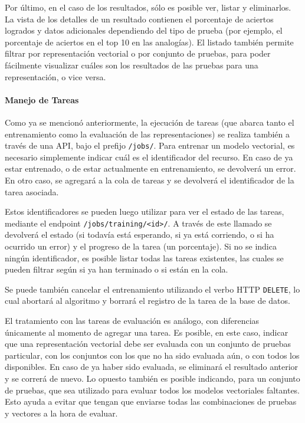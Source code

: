 Por último, en el caso de los resultados, sólo es posible ver, listar y eliminarlos. La vista de los
detalles de un resultado contienen el porcentaje de aciertos logrados y datos adicionales
dependiendo del tipo de prueba (por ejemplo, el porcentaje de aciertos en el top 10 en las
analogías). El listado también permite filtrar por representación vectorial o por conjunto de pruebas,
para poder fácilmente visualizar cuáles son los resultados de las pruebas para una representación, o
vice versa.


\paragraph{Manejo de Tareas}

Como ya se mencionó anteriormente, la ejecución de tareas (que abarca tanto el entrenamiento como la
evaluación de las representaciones) se realiza también a través de una API, bajo el prefijo
\texttt{/jobs/}. Para entrenar un modelo vectorial, es necesario simplemente indicar cuál es el
identificador del recurso. En caso de ya estar entrenado, o de estar actualmente en entrenamiento,
se devolverá un error. En otro caso, se agregará a la cola de tareas y se devolverá el identificador
de la tarea asociada.

Estos identificadores se pueden luego utilizar para ver el estado de las tareas, mediante el
endpoint \texttt{/jobs/training/<id>/}. A través de este llamado se devolverá el estado (si todavía
está esperando, si ya está corriendo, o si ha ocurrido un error) y el progreso de la tarea (un
porcentaje). Si no se indica ningún identificador, es posible listar todas las tareas existentes,
las cuales se pueden filtrar según si ya han terminado o si están en la cola.

Se puede también cancelar el entrenamiento utilizando el verbo HTTP \texttt{DELETE}, lo cual
abortará al algoritmo y borrará el registro de la tarea de la base de datos.

El tratamiento con las tareas de evaluación es análogo, con diferencias únicamente al momento de
agregar una tarea. Es posible, en este caso, indicar que una representación vectorial debe ser
evaluada con un conjunto de pruebas particular, con los conjuntos con los que no ha sido evaluada
aún, o con todos los disponibles. En caso de ya haber sido evaluada, se eliminará el resultado
anterior y se correrá de nuevo. Lo opuesto también es posible indicando, para un conjunto de
pruebas, que sea utilizado para evaluar todos los modelos vectoriales faltantes. Esto ayuda a evitar
que tengan que enviarse todas las combinaciones de pruebas y vectores a la hora de evaluar.


